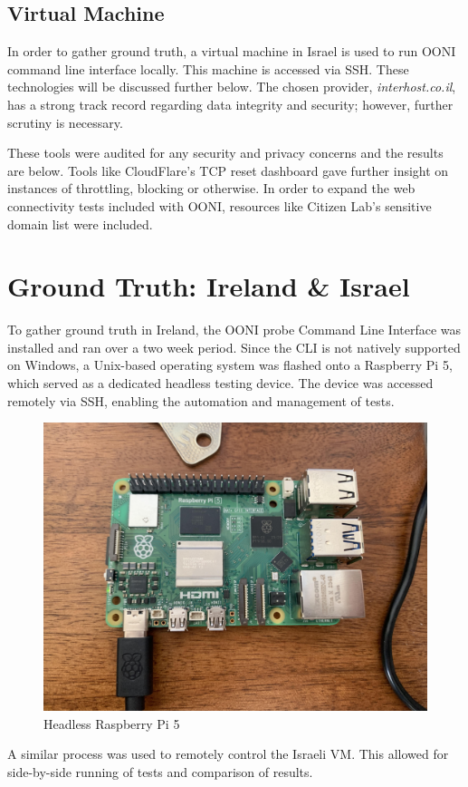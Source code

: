 \subsection{Virtual Machine}
In order to gather ground truth, a virtual machine in Israel is used to run OONI command line interface locally. This machine is accessed via SSH. These technologies will be discussed further below. The chosen provider, \textit{interhost.co.il}, has a strong track record regarding data integrity and security; however, further scrutiny is necessary. \cite{interhost} 

These tools were audited for any security and privacy concerns and the results are below. Tools like CloudFlare's TCP reset dashboard \cite{cloudflare_policy_blog} gave further insight on instances of throttling, blocking or otherwise. In order to expand the web connectivity tests included with OONI, resources like Citizen Lab's sensitive domain list were included. \cite{citizenlab_testlists} 

\section{Ground Truth: Ireland \& Israel}
To gather ground truth in Ireland, the OONI probe Command Line Interface was installed and ran over a two week period. Since the CLI is not natively supported on Windows, a Unix-based operating system was flashed onto a Raspberry Pi 5, which served as a dedicated headless testing device. The device was accessed remotely via SSH, enabling the automation and management of tests. 

\begin{figure} [H]
    \centering
    \includegraphics[width=0.5\linewidth]{RasPi5.jpg}
    \caption{Headless Raspberry Pi 5}
    \label{fig:enter-label}
\end{figure}

A similar process was used to remotely control the Israeli VM. This allowed for side-by-side running of tests and comparison of results. 

